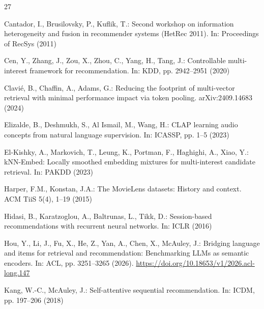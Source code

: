 \documentclass[runningheads]{llncs}
\newif\ifincludeacknowledgements
\begin{document}
\ifincludeacknowledgements
\section*{Acknowledgements}
The paper is partially supported by the University of Piraeus Research Center.
\fi

\clearpage
\begin{thebibliography}{27}
\label{page:references-start}

Cantador, I., Brusilovsky, P., Kuflik, T.:
Second workshop on information heterogeneity and fusion in recommender systems
(HetRec 2011). In: Proceedings of RecSys (2011)

Cen, Y., Zhang, J., Zou, X., Zhou, C., Yang, H., Tang, J.:
Controllable multi-interest framework for recommendation.
In: KDD, pp. 2942--2951 (2020)

Clavi\'e, B., Chaffin, A., Adams, G.:
Reducing the footprint of multi-vector retrieval with minimal performance
impact via token pooling. arXiv:2409.14683 (2024)

Elizalde, B., Deshmukh, S., Al Ismail, M., Wang, H.:
CLAP learning audio concepts from natural language supervision.
In: ICASSP, pp. 1--5 (2023)

El-Kishky, A., Markovich, T., Leung, K., Portman, F., Haghighi, A., Xiao, Y.:
kNN-Embed: Locally smoothed embedding mixtures for multi-interest candidate
retrieval. In: PAKDD (2023)

Harper, F.M., Konstan, J.A.:
The MovieLens datasets: History and context.
ACM TiiS 5(4), 1--19 (2015)

Hidasi, B., Karatzoglou, A., Baltrunas, L., Tikk, D.:
Session-based recommendations with recurrent neural networks.
In: ICLR (2016)

Hou, Y., Li, J., Fu, X., He, Z., Yan, A., Chen, X., McAuley, J.:
Bridging language and items for retrieval and recommendation: Benchmarking
LLMs as semantic encoders.
In: ACL, pp. 3251--3265 (2026).
\url{https://doi.org/10.18653/v1/2026.acl-long.147}

Kang, W.-C., McAuley, J.:
Self-attentive sequential recommendation.
In: ICDM, pp. 197--206 (2018)


\end{thebibliography}
\end{document}

